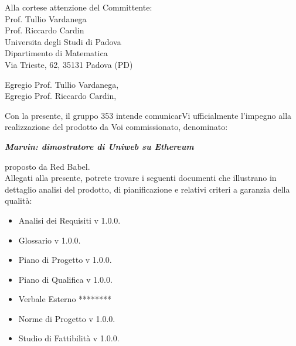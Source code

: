\documentclass[openany, a4paper, 12pt]{letter}
\begin{document}
	
	\begin{letter}{
			Alla cortese attenzione del Committente:\\
			\smallskip
			Prof. Tullio Vardanega\\
			Prof. Riccardo Cardin\\
			\medskip
			Universita degli Studi di Padova \\
			Dipartimento di Matematica\\
			Via Trieste, 62, 35131 Padova (PD)}
			\opening{Egregio Prof. Tullio Vardanega, \\
				Egregio Prof. Riccardo Cardin,}
			Con la presente, il gruppo 353 intende comunicarVi ufficialmente l’impegno alla realizzazione del
			prodotto da Voi commissionato, denominato: \\
			\begin{center}
			\emph{\textbf{Marvin: dimostratore di Uniweb su Ethereum}}\medskip \\
			\end{center}
			proposto da Red Babel.\medskip\\
			Allegati alla presente, potrete trovare i seguenti documenti che illustrano in dettaglio analisi del
			prodotto, di pianificazione e relativi criteri a garanzia della qualità: 
			\begin{itemize}
				\item Analisi dei Requisiti v 1.0.0.
				\item Glossario v 1.0.0.
				\item Piano di Progetto v 1.0.0.
				\item Piano di Qualifica v 1.0.0.
				\item Verbale Esterno ********%
				\item Norme di Progetto v 1.0.0.
				\item Studio di Fattibilità v 1.0.0.
				\end{itemize}
			
			\thispagestyle{firstpage}
			\newpage
			

\end{letter}
\end{document}
